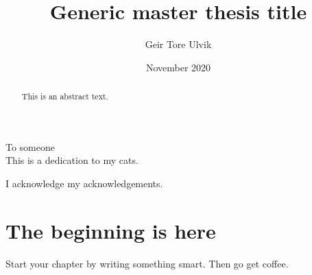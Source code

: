 \documentclass[twoside,english]{uiofysmaster}
\author{Geir Tore Ulvik}
\title{Generic master thesis title}
\date{November 2020}
\begin{document}
\maketitle

\begin{abstract}
This is an abstract text.
\end{abstract}

\begin{dedication}
  To someone
  \\\vspace{12pt}
  This is a dedication to my cats.
\end{dedication}

\begin{acknowledgements}
  I acknowledge my acknowledgements.
\end{acknowledgements}

\tableofcontents

\chapter{The beginning is here}

Start your chapter by writing something smart. Then go get coffee.
\end{document}
